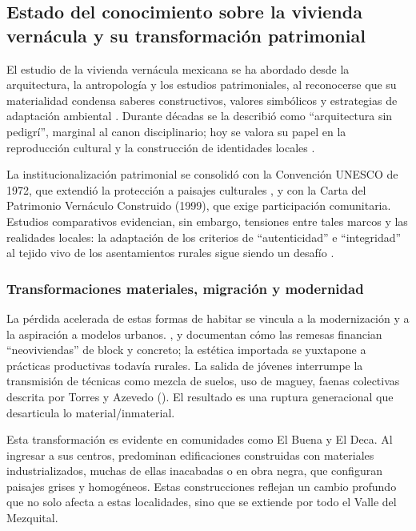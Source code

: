 \subsection{Estado del conocimiento sobre la vivienda vernácula y su transformación patrimonial}

El estudio de la vivienda vernácula mexicana se ha abordado desde la arquitectura, la antropología y los estudios patrimoniales, al reconocerse que su materialidad condensa saberes constructivos, valores simbólicos y estrategias de adaptación ambiental \cite{rudofsky1964, zarate2009arquitectura}.  Durante décadas se la describió como ``arquitectura sin pedigrí'', marginal al canon disciplinario; hoy se valora su papel en la reproducción cultural y la construcción de identidades locales \cite{gonzalez2017arquitectura, icomos1999carta}.

La institucionalización patrimonial se consolidó con la Convención UNESCO de 1972, que extendió la protección a paisajes culturales \cite{UNESCO1972}, y con la Carta del Patrimonio Vernáculo Construido (1999), que exige participación comunitaria.  Estudios comparativos evidencian, sin embargo, tensiones entre tales marcos y las realidades locales: la adaptación de los criterios de ``autenticidad'' e ``integridad'' al tejido vivo de los asentamientos rurales sigue siendo un desafío \cite{venecia1964card, icomos1999carta, prats1998concepto}.

\subsubsection{Transformaciones materiales, migración y modernidad}

La pérdida acelerada de estas formas de habitar se vincula a la modernización y a la aspiración a modelos urbanos. \cite{alvarez2003maguey}, \cite{juarez2018transformacion} y \cite{boils2010remesas} documentan cómo las remesas financian ``neoviviendas'' de block y concreto; la estética importada se yuxtapone a prácticas productivas todavía rurales.  La salida de jóvenes interrumpe la transmisión de técnicas como mezcla de suelos, uso de maguey, faenas colectivas descrita por Torres y Azevedo (\citeyear{torres2021transmision}).  El resultado es una ruptura generacional que desarticula lo material/inmaterial.

Esta transformación es evidente en comunidades como El Buena y El Deca. Al ingresar a sus centros, predominan edificaciones construidas con materiales industrializados, muchas de ellas inacabadas o en obra negra, que configuran paisajes grises y homogéneos. Estas construcciones reflejan un cambio profundo que no solo afecta a estas localidades, sino que se extiende por todo el Valle del Mezquital.

